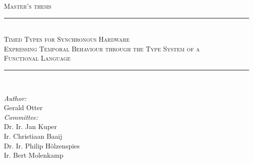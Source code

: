 \documentclass[a4paper, 11pt,oldfontcommands]{memoir}
\begin{document}
\makeatletter
\newsavebox{\@brx}
\newcommand{\llangle}[1][]{\savebox{\@brx}{\(\m@th{#1\langle}\)}%
  \mathopen{\copy\@brx\kern-0.5\wd\@brx\usebox{\@brx}}}
\newcommand{\rrangle}[1][]{\savebox{\@brx}{\(\m@th{#1\rangle}\)}%
  \mathclose{\copy\@brx\kern-0.5\wd\@brx\usebox{\@brx}}}
\makeatother

\begin{titlingpage}
  \begin{center}
    \textsc{Master's thesis} \\
    \vspace{0.5cm}
    \rule{\textwidth}{1pt} \\
    \vspace{0.5cm}
    \LARGE \textsc{Timed Types for Synchronous Hardware} \\
    \vspace{0.5cm}
    \large \textsc{Expressing Temporal Behaviour through the Type System of a\\Functional Language} \\
    \vspace{0.5cm} 
    \rule{\textwidth}{1pt} \\
    \vspace{7cm}
  \end{center} 
  \emph{Author:}\\ 
  Gerald Otter \\
  \newline
  \emph{Committee:}\\ 
  Dr. Ir. Jan Kuper\\
  Ir. Christiaan Baaij\\
  Dr. Ir. Philip H\"olzenspies\\
  Ir. Bert Molenkamp\\


\end{titlingpage}
\end{document}
